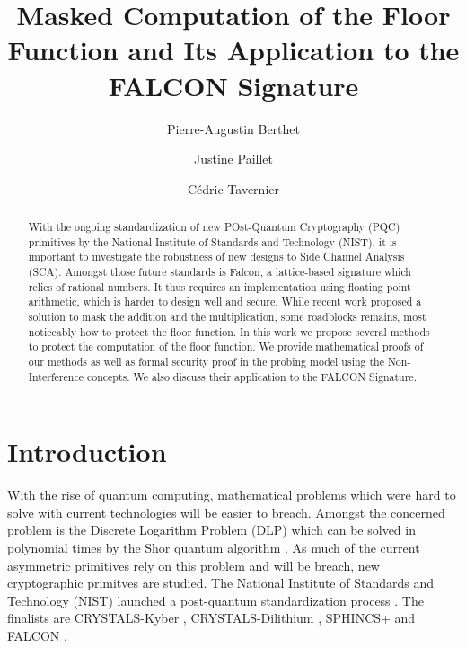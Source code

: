\documentclass[runningheads]{llncs}
\begin{document}
%
\title{Masked Computation of the Floor Function and Its Application to the FALCON Signature}
%
%
\author{Pierre-Augustin Berthet \and
Justine Paillet \and
C\'edric Tavernier}
%
%
%
\maketitle              %
%
\begin{abstract}
With the ongoing standardization of new POst-Quantum Cryptography (PQC) primitives by the National Institute of Standards and Technology (NIST), it is important to investigate the robustness of new designs to Side Channel Analysis (SCA). Amongst those future standards is Falcon, a lattice-based signature which relies of rational numbers. It thus requires an implementation using floating point arithmetic, which is harder to design well and secure. While recent work proposed a solution to mask the addition and the multiplication, some roadblocks remains, most noticeably how to protect the floor function. In this work we propose several methods to protect the computation of the floor function. We provide mathematical proofs of our methods as well as formal security proof in the probing model using the Non-Interference concepts. We also discuss their application to the FALCON Signature.

\end{abstract}
%
%
%
\section{Introduction}
With the rise of quantum computing, mathematical problems which were hard to solve with current technologies will be easier to breach. Amongst the concerned problem is the Discrete Logarithm Problem (DLP) which can be solved in polynomial times by the Shor quantum algorithm \cite{doi:10.1137/S0036144598347011}. As much of the current asymmetric primitives rely on this problem and will be breach, new cryptographic primitves are studied. The National Institute of Standards and Technology (NIST) launched a post-quantum standardization process \cite{chen2016report}. The finalists are CRYSTALS-Kyber \cite{8406610,nistfips203mlkem}, CRYSTALS-Dilithium \cite{Ducas_Kiltz_Lepoint_Lyubashevsky_Schwabe_Seiler_Stehlé_2018,nistfips204mldsa}, SPHINCS+ \cite{10.1145/3319535.3363229,nistfips205shdsa} and FALCON \cite{prest2020falcon}.
\end{document}
